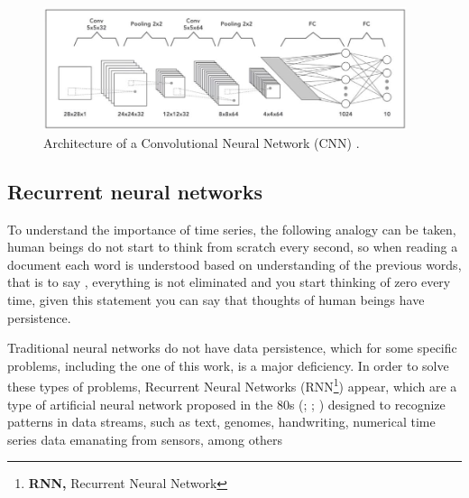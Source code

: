 \begin{figure}[h!]
  \begin{center}	\includegraphics[width=0.95\textwidth]{imagenes/Cap4/cnn}
  \caption{Architecture of a Convolutional Neural Network (CNN) \protect\cite{Reference71}.}
  \label{fig:cnn}
  \end{center}
\end{figure}

\subsection{Recurrent neural networks}

To understand the importance of time series, the following analogy can be taken, human beings do not start to think from scratch every second, so when reading a document each word is understood based on understanding of the previous words, that is to say , everything is not eliminated and you start thinking of zero every time, given this statement you can say that thoughts of human beings have persistence.

\vspace{5mm} %

Traditional neural networks do not have data persistence, which for some specific problems, including the one of this work, is a major deficiency. In order to solve these types of problems, Recurrent Neural Networks (RNN\footnote{\textbf{RNN,} Recurrent Neural Network}) appear, which are a type of artificial neural network proposed in the 80s (; ; ) designed to recognize patterns in data streams, such as text, genomes, handwriting, numerical time series data emanating from sensors, among others

